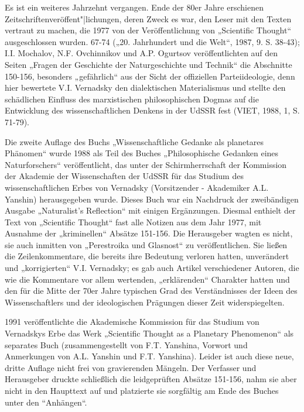 \documentclass[11pt,a4paper]{article}
\begin{document}
Es ist ein weiteres Jahrzehnt vergangen. Ende der 80er Jahre erschienen
Zeitschriftenveröffent"|lichungen, deren Zweck es war, den Leser mit den
Texten vertraut zu machen, die 1977 von der Veröffentlichung von „Scientific
Thought“ ausgeschlossen wurden. 67-74 („20. Jahrhundert und die Welt“, 1987,
9. S. 38-43); I.I. Mochalov, N.F. Ovchinnikov und A.P. Ogurtsov
veröffentlichten auf den Seiten „Fragen der Geschichte der Naturgeschichte und
Technik“ die Abschnitte 150-156, besonders „gefährlich“ aus der Sicht der
offiziellen Parteiideologie, denn hier bewertete V.I. Vernadsky den
dialektischen Materialismus und stellte den schädlichen Einfluss des
marxistischen philosophischen Dogmas auf die Entwicklung des
wissenschaftlichen Denkens in der UdSSR fest (VIET, 1988, 1, S. 71-79).

Die zweite Auflage des Buchs „Wissenschaftliche Gedanke als planetares
Phänomen“ wurde 1988 als Teil des Buches „Philosophische Gedanken eines
Naturforschers“ veröffentlicht, das unter der Schirmherrschaft der Kommission
der Akademie der Wissenschaften der UdSSR für das Studium des
wissenschaftlichen Erbes von Vernadsky (Vorsitzender - Akademiker
A.L. Yanshin) herausgegeben wurde. Dieses Buch war ein Nachdruck der
zweibändigen Ausgabe „Naturalist's Reflection“ mit einigen Ergänzungen.
Diesmal enthielt der Text von „Scientific Thought“ fast alle Notizen aus dem
Jahr 1977, mit Ausnahme der „kriminellen“ Absätze 151-156. Die Herausgeber
wagten es nicht, sie auch inmitten von „Perestroika und Glasnost“ zu
veröffentlichen. Sie ließen die Zeilenkommentare, die bereits ihre Bedeutung
verloren hatten, unverändert und „korrigierten“ V.I. Vernadsky; es gab auch
Artikel verschiedener Autoren, die wie die Kommentare vor allem wertenden,
„erklärenden“ Charakter hatten und den für die Mitte der 70er Jahre typischen
Grad des Verständnisses der Ideen des Wissenschaftlers und der ideologischen
Prägungen dieser Zeit widerspiegelten.

1991 veröffentlichte die Akademische Kommission für das Studium von Vernadskys
Erbe das Werk „Scientific Thought as a Planetary Phenomenon“ als separates
Buch (zusammengestellt von F.T. Yanshina, Vorwort und Anmerkungen von
A.L. Yanshin und F.T. Yanshina). Leider ist auch diese neue, dritte Auflage
nicht frei von gravierenden Mängeln. Der Verfasser und Herausgeber druckte
schließlich die leidgeprüften Absätze 151-156, nahm sie aber nicht in den
Haupttext auf und platzierte sie sorgfältig am Ende des Buches unter den
“Anhängen“.
\end{document}
